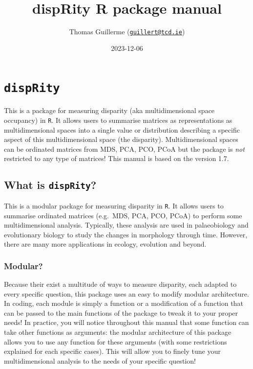 \documentclass[
]{book}
\title{dispRity R package manual}
\author{Thomas Guillerme (\href{mailto:guillert@tcd.ie}{\nolinkurl{guillert@tcd.ie}})}
\date{2023-12-06}
\begin{document}
\maketitle

{
\setcounter{tocdepth}{1}
\tableofcontents
}
\hypertarget{disprity}{%
\chapter{\texorpdfstring{\texttt{dispRity}}{dispRity}}\label{disprity}}

This is a package for measuring disparity (aka multidimensional space occupancy) in \texttt{R}.
It allows users to summarise matrices as representations as multidimensional spaces into a single value or distribution describing a specific aspect of this multidimensional space (the disparity).
Multidimensional spaces can be ordinated matrices from MDS, PCA, PCO, PCoA but the package is \emph{not} restricted to any type of matrices!
This manual is based on the version 1.7.

\hypertarget{what-is-disprity}{%
\section{\texorpdfstring{What is \texttt{dispRity}?}{What is dispRity?}}\label{what-is-disprity}}

This is a modular package for measuring disparity in \texttt{R}.
It allows users to summarise ordinated matrices (e.g.~MDS, PCA, PCO, PCoA) to perform some multidimensional analysis.
Typically, these analysis are used in palaeobiology and evolutionary biology to study the changes in morphology through time.
However, there are many more applications in ecology, evolution and beyond.

\hypertarget{modular}{%
\subsection{Modular?}\label{modular}}

Because their exist a multitude of ways to measure disparity, each adapted to every specific question, this package uses an easy to modify modular architecture.
In coding, each module is simply a function or a modification of a function that can be passed to the main functions of the package to tweak it to your proper needs!
In practice, you will notice throughout this manual that some function can take other functions as arguments: the modular architecture of this package allows you to use any function for these arguments (with some restrictions explained for each specific cases).
This will allow you to finely tune your multidimensional analysis to the needs of your specific question!
\end{document}
